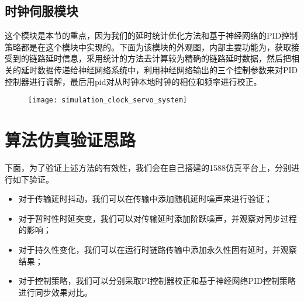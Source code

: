 \subsection{时钟伺服模块}
这个模块是本节的重点，因为我们的延时统计优化方法和基于神经网络的PID控制策略都是在这个模块中实现的。下面为该模块的外观图，内部主要功能为，获取接受到的链路延时信息，采用统计的方法去计算较为精确的链路延时数据，然后把相关的延时数据传递给神经网络系统中，利用神经网络输出的三个控制参数来对PID控制器进行调解，最后用pid对从时钟本地时钟的相位和频率进行校正。
\begin{figure}[!hbp]
  \centering
  \begin{minipage}[b]{0.6\textwidth}
    \captionstyle{\centering}
    \centering
    \texttt{[image: simulation\_clock\_servo\_system]}
  \end{minipage}     
\end{figure}

\section{算法仿真验证思路}
下面，为了验证上述方法的有效性，我们会在自己搭建的1588仿真平台上，分别进行如下验证。
\begin{itemize}[noitemsep,topsep=0pt,parsep=0pt,partopsep=0pt]
  \item 对于传输延时抖动，我们可以在传输中添加随机延时噪声来进行验证；
  \item 对于暂时性时延突变，我们可以对传输延时添加阶跃噪声，并观察对同步过程的影响；
  \item 对于持久性变化，我们可以在运行时链路传输中添加永久性固有延时，并观察结果；
  \item 对于控制策略，我们可以分别采取PI控制器校正和基于神经网络PID控制策略进行同步效果对比。
\end{itemize}

